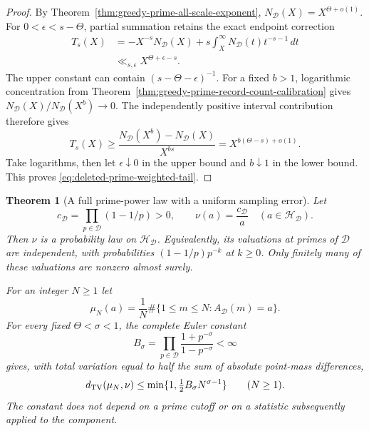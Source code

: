 \documentclass[11pt]{article}
\newtheorem{theorem}{Theorem}[section]
\theoremstyle{definition}
\begin{document}
\begin{proof}
By Theorem~\ref{thm:greedy-prime-all-scale-exponent},
$N_{\mathcal D}(X)=X^{\Theta+o(1)}$.
For $0<\epsilon<s-\Theta$, partial summation retains the exact
endpoint correction
\[
 \begin{aligned}
 T_s(X)&=-X^{-s}N_{\mathcal D}(X)
              +s\int_X^\infty N_{\mathcal D}(t)t^{-s-1}\,dt\\
       &\ll_{s,\epsilon}X^{\Theta+\epsilon-s}.
 \end{aligned}
\]
The upper constant can contain $(s-\Theta-\epsilon)^{-1}$.
For a fixed $b>1$, logarithmic concentration from
Theorem~\ref{thm:greedy-prime-record-count-calibration} gives
$N_{\mathcal D}(X)/N_{\mathcal D}(X^b)\to0$.
The independently positive interval contribution therefore gives
\[
 T_s(X)\ge
 \frac{N_{\mathcal D}(X^b)-N_{\mathcal D}(X)}{X^{bs}}
       =X^{b(\Theta-s)+o(1)}.
\]
Take logarithms, then let $\epsilon\downarrow0$ in the upper bound
and $b\downarrow1$ in the lower bound.
This proves \eqref{eq:deleted-prime-weighted-tail}.
\end{proof}

\begin{theorem}[A full prime-power law with a uniform sampling error]
\label{thm:deleted-component-sampling-law}
Let
\[
 c_{\mathcal D}=\prod_{p\in\mathcal D}(1-1/p)>0,\qquad
 \nu(a)=\frac{c_{\mathcal D}}a
                         \quad(a\in\mathcal H_{\mathcal D}).
\]
Then $\nu$ is a probability law on $\mathcal H_{\mathcal D}$.
Equivalently, its valuations at primes of $\mathcal D$ are independent,
with probabilities $(1-1/p)p^{-k}$ at $k\ge0$.
Only finitely many of these valuations are nonzero almost surely.

For an integer $N\ge1$ let
\[
 \mu_N(a)=\frac1N
       \#\{1\le m\le N:A_{\mathcal D}(m)=a\}.
\]
For every fixed $\Theta<\sigma<1$, the complete Euler constant
\begin{equation}
 B_\sigma=\prod_{p\in\mathcal D}
                  \frac{1+p^{-\sigma}}{1-p^{-\sigma}}<\infty
 \label{eq:deleted-component-Euler-budget}
\end{equation}
gives, with total variation equal to half the sum of absolute
point-mass differences,
\begin{equation}
 d_{\rm TV}(\mu_N,\nu)
       \le\min\{1,\tfrac12 B_\sigma N^{\sigma-1}\}
                         \qquad(N\ge1).
 \label{eq:deleted-component-uniform-TV}
\end{equation}
The constant does not depend on a prime cutoff or on a statistic
subsequently applied to the component.
\end{theorem}
\end{document}
